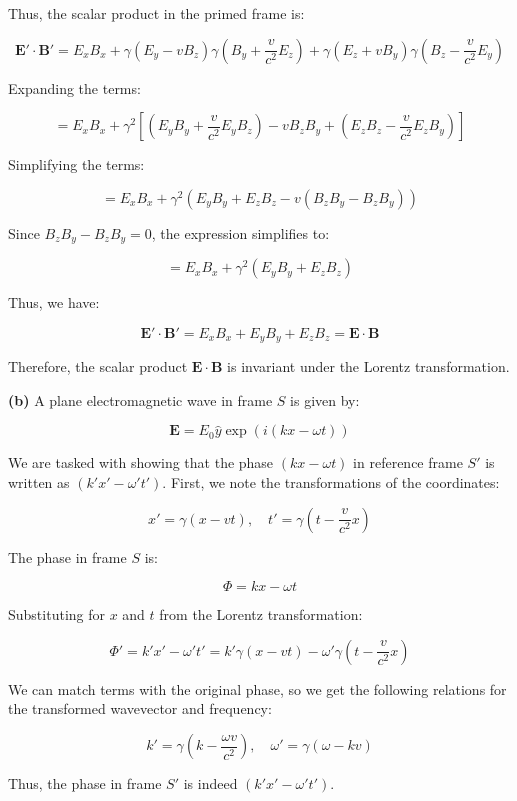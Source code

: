 Thus, the scalar product in the primed frame is:

\[
\mathbf{E}' \cdot \mathbf{B}' = E_x B_x + \gamma (E_y - v B_z) \gamma \left( B_y + \frac{v}{c^2} E_z \right) + \gamma (E_z + v B_y) \gamma \left( B_z - \frac{v}{c^2} E_y \right)
\]

Expanding the terms:

\[
= E_x B_x + \gamma^2 \left[ (E_y B_y + \frac{v}{c^2} E_y B_z) - v B_z B_y + (E_z B_z - \frac{v}{c^2} E_z B_y) \right]
\]

Simplifying the terms:

\[
= E_x B_x + \gamma^2 \left( E_y B_y + E_z B_z - v (B_z B_y - B_z B_y) \right)
\]

Since \( B_z B_y - B_z B_y = 0 \), the expression simplifies to:

\[
= E_x B_x + \gamma^2 \left( E_y B_y + E_z B_z \right)
\]

Thus, we have:

\[
\mathbf{E}' \cdot \mathbf{B}' = E_x B_x + E_y B_y + E_z B_z = \mathbf{E} \cdot \mathbf{B}
\]

Therefore, the scalar product \( \mathbf{E} \cdot \mathbf{B} \) is invariant under the Lorentz transformation.

\textbf{(b)} A plane electromagnetic wave in frame \( S \) is given by:

\[
\mathbf{E} = E_0 \hat{y} \exp \left( i (k x - \omega t) \right)
\]

We are tasked with showing that the phase \( (k x - \omega t) \) in reference frame \( S' \) is written as \( (k' x' - \omega' t') \). First, we note the transformations of the coordinates:

\[
x' = \gamma (x - v t), \quad t' = \gamma \left( t - \frac{v}{c^2} x \right)
\]

The phase in frame \( S \) is:

\[
\Phi = k x - \omega t
\]

Substituting for \( x \) and \( t \) from the Lorentz transformation:

\[
\Phi' = k' x' - \omega' t' = k' \gamma (x - v t) - \omega' \gamma \left( t - \frac{v}{c^2} x \right)
\]

We can match terms with the original phase, so we get the following relations for the transformed wavevector and frequency:

\[
k' = \gamma \left( k - \frac{\omega v}{c^2} \right), \quad \omega' = \gamma (\omega - k v)
\]

Thus, the phase in frame \( S' \) is indeed \( (k' x' - \omega' t') \).

